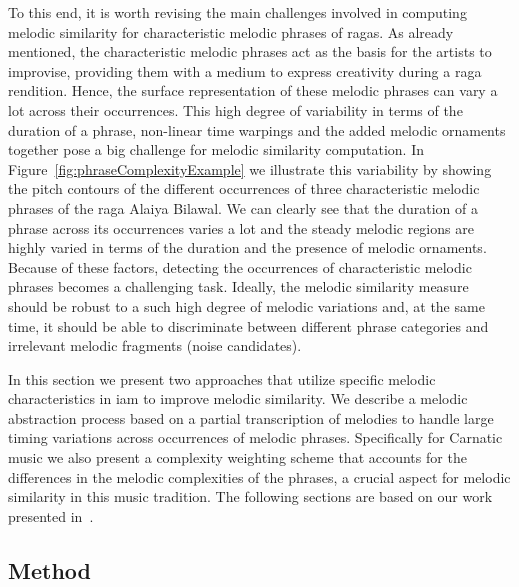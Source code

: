 To this end, it is worth revising the main challenges involved in computing melodic similarity for characteristic melodic phrases of \glspl{raga}. As already mentioned, the characteristic melodic phrases act as the basis for the artists to improvise, providing them with a medium to express creativity during a \gls{raga} rendition. Hence, the surface representation of these melodic phrases can vary a lot across their occurrences. This high degree of variability in terms of the duration of a phrase, non-linear time warpings and the added melodic ornaments together pose a big challenge for melodic similarity computation. In Figure~\ref{fig:phraseComplexityExample} we illustrate this variability by showing the pitch contours of the different occurrences of three characteristic melodic phrases of the \gls{raga} Alaiya Bilawal. We can clearly see that the duration of a phrase across its occurrences varies a lot and the steady melodic regions are highly varied in terms of the duration and the presence of melodic ornaments. Because of these factors, detecting the occurrences of characteristic melodic phrases becomes a challenging task. Ideally, the melodic similarity measure should be robust to a such high degree of melodic variations and, at the same time, it should be able to discriminate between different phrase categories and irrelevant melodic fragments (noise candidates).

In this section we present two approaches that utilize specific melodic characteristics in \gls{iam} to improve melodic similarity. We describe a melodic abstraction process based on a partial transcription of melodies to handle large timing variations across occurrences of melodic phrases. Specifically for Carnatic music we also present a complexity weighting scheme that accounts for the differences in the melodic complexities of the phrases, a crucial aspect for melodic similarity in this music tradition. The following sections are based on our work presented in~\cite{gulati_ISMIR_2015}.



\subsection{Method}
\label{sec:patterns_improving_similarity_method}


